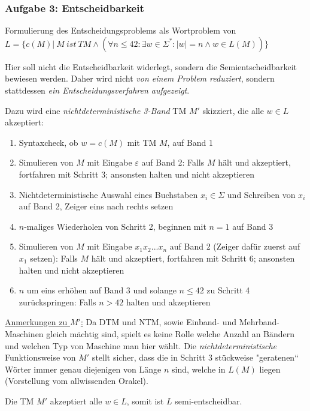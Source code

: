 \subsubsection{Aufgabe 3: Entscheidbarkeit}
\begin{teile}
	\item
	Formulierung des Entscheidungsproblems als Wortproblem von\\
	$L=\{c(M)|\ M\ ist\ TM \wedge (\forall n \leq 42: \exists w \in \Sigma^*: |w|=n \wedge w \in L(M))\}$

	Hier soll nicht die Entscheidbarkeit widerlegt, sondern die Semientscheidbarkeit bewiesen werden. Daher wird nicht \textit{von einem Problem reduziert}, sondern stattdessen \textit{ein Entscheidungsverfahren aufgezeigt}.
	
	Dazu wird eine \textit{nichtdeterministische 3-Band} TM $M'$ skizziert, die alle $w \in L$ akzeptiert:
	\begin{enumerate}
		\item Syntaxcheck, ob $w=c(M)$ mit TM $M$, auf Band 1
		\item Simulieren von $M$ mit Eingabe $\varepsilon$ auf Band 2: Falls $M$ hält und akzeptiert, fortfahren mit Schritt 3; ansonsten halten und nicht akzeptieren
		\item Nichtdeterministische Auswahl eines Buchstaben $x_i \in \Sigma$ und Schreiben von $x_i$ auf Band 2, Zeiger eins nach rechts setzen
		\item $n$-maliges Wiederholen von Schritt 2, beginnen mit $n=1$ auf Band 3
		\item Simulieren von $M$ mit Eingabe $x_1x_2...x_n$ auf Band 2 (Zeiger dafür zuerst auf $x_1$ setzen): Falls $M$ hält und akzeptiert, fortfahren mit Schritt 6; ansonsten halten und nicht akzeptieren
		\item $n$ um eins erhöhen auf Band 3 und solange $n \leq 42$ zu Schritt 4 zurückspringen: Falls $n > 42$ halten und akzeptieren
	\end{enumerate}

	\underline{Anmerkungen zu $M'$:} Da DTM und NTM, sowie Einband- und Mehrband-Maschinen gleich mächtig sind, spielt es keine Rolle welche Anzahl an Bändern und welchen Typ von Maschine man hier wählt. Die \textit{nichtdeterministische} Funktionsweise von $M'$ stellt sicher, dass die in Schritt 3 stückweise "geratenen“ Wörter immer genau diejenigen von Länge $n$ sind, welche in $L(M)$ liegen (Vorstellung vom allwissenden Orakel).

	Die TM $M'$ akzeptiert alle $w \in L$, somit ist $L$ semi-entscheidbar.
	

\end{teile}
